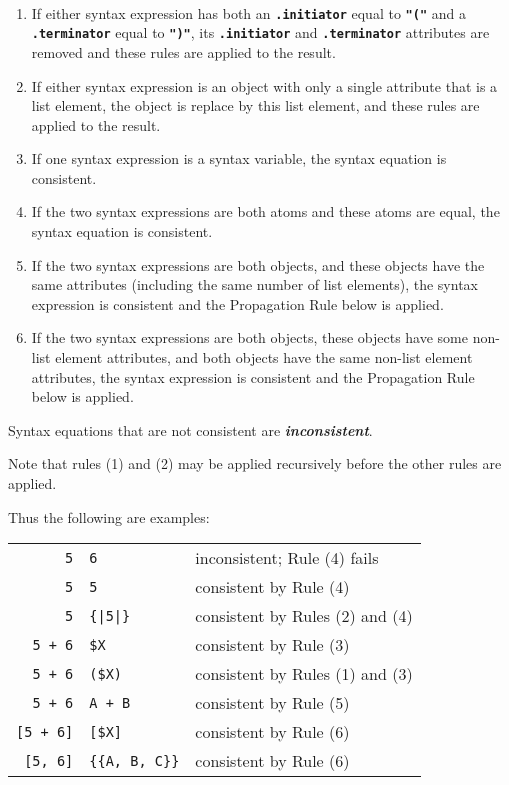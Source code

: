\documentclass[12pt]{article}
\newcommand{\TT}[1]{{\tt \bfseries #1}}
\newcommand{\key}[1]{{\bf \em #1}\index{#1}}
\newcommand{\ikey}[2]{{\bf \em #1}\index{#2}}
\newenvironment{indpar}[1][0.3in]%
	{\begin{list}{}%
		     {\setlength{\itemsep}{0in}%
		      \setlength{\topsep}{0in}%
		      \setlength{\parsep}{1ex}%
		      \setlength{\labelwidth}{#1}%
		      \setlength{\leftmargin}{#1}%
		      \addtolength{\leftmargin}{\labelsep}}%
	 \item}%
	{\end{list}}
\begin{document}
\begin{indpar}
\begin{list}{}{}
\item[\ikey{Syntax Equation Consistency Rules}%
           {consistency rules!syntax equation}%
	   \label{SYNTAX-EQUATION-CONSISTENCY-RULES}:]~

\begin{enumerate}
\item If either syntax expression has both an \TT{.initiator} equal to \TT{"("}
and a \TT{.ter\-min\-a\-tor} equal to \TT{")"}, its \TT{.initiator} and
\TT{.terminator} attributes are removed and these rules are applied to the
result.
\item If either syntax expression is an object with only a single attribute
that is a list element,
the object is replace by this list element,
and these rules are applied to the
result.
\item If one syntax expression is a syntax variable, the syntax equation
is consistent.
\item If the two syntax expressions are both atoms and these atoms are
equal, the syntax equation is consistent.
\item If the two syntax expressions are both objects, and these objects
have the same attributes (including the same number of list elements),
the syntax expression is consistent and the Propagation Rule
below is applied.
\item If the two syntax expressions are both objects, these objects
have some non-list element attributes, and both objects have the same
non-list element attributes,
the syntax expression is consistent and the Propagation Rule
below is applied.
\end{enumerate}

Syntax equations that are not consistent are \key{inconsistent}.

Note that rules (1) and (2) may be applied recursively
before the other rules are applied.
\end{list}
\end{indpar}

Thus the following are examples:

\begin{center}
\begin{tabular}{r@\TT{~:=:~}ll}
\verb/5/ & \verb/6/      & inconsistent; Rule (4) fails \\
\verb/5/ & \verb/5/      & consistent by Rule (4) \\
\verb/5/ & \verb/{|5|}/  & consistent by Rules (2) and (4) \\
\verb/5 + 6/ & \verb/$X/ & consistent by Rule (3) \\
\verb/5 + 6/ & \verb/($X)/ & consistent by Rules (1) and (3) \\
\verb/5 + 6/ & \verb/A + B/ & consistent by Rule (5) \\
\verb/[5 + 6]/ & \verb/[$X]/ & consistent by Rule (6) \\
\verb/[5, 6]/ & \verb/{{A, B, C}}/ & consistent by Rule (6) \\
\end{tabular}
\end{center}
\end{document}
